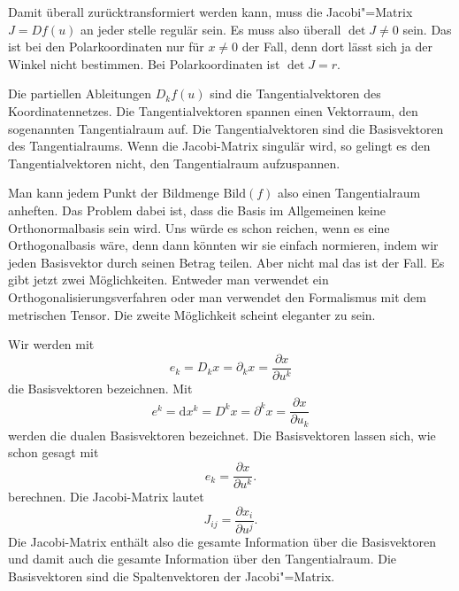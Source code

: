 \documentclass[a4paper,10pt,fleqn,twocolumn,twoside]{article}
\begin{document}
Damit überall zurücktransformiert werden kann, muss die
Jacobi"=Matrix \(J=Df(u)\) an jeder stelle regulär sein. Es muss also
überall \(\det J\neq 0\) sein. Das ist bei den Polarkoordinaten nur
für \(x\neq 0\) der Fall, denn dort lässt sich ja der Winkel nicht
bestimmen. Bei Polarkoordinaten ist \(\det J=r\).

Die partiellen Ableitungen \(D_k f(u)\) sind die Tangentialvektoren
des Koordinatennetzes. Die Tangentialvektoren spannen einen
Vektorraum, den sogenannten Tangentialraum auf. Die
Tangentialvektoren sind die Basisvektoren des Tangentialraums.
Wenn die Jacobi-Matrix singulär wird, so gelingt es den
Tangentialvektoren nicht, den Tangentialraum aufzuspannen.

Man kann jedem Punkt der Bildmenge \(\mathrm{Bild}(f)\) also einen
Tangentialraum anheften. Das Problem dabei ist, dass die Basis im
Allgemeinen keine Orthonormalbasis sein wird. Uns würde es schon
reichen, wenn es eine Orthogonalbasis wäre, denn dann könnten wir sie
einfach normieren, indem wir jeden Basisvektor durch seinen Betrag
teilen. Aber nicht mal das ist der Fall. Es gibt jetzt zwei
Möglichkeiten. Entweder man verwendet ein Orthogonalisierungsverfahren
oder man verwendet den Formalismus mit dem metrischen Tensor.
Die zweite Möglichkeit scheint eleganter zu sein.

Wir werden mit
\[e_k = D_kx = \partial_kx = \frac{\partial x}{\partial u^k}\]
die Basisvektoren bezeichnen. Mit
\[e^k = \mathrm dx^k = D^kx = \partial^kx = \frac{\partial x}{\partial u_k}\]
werden die dualen Basisvektoren bezeichnet. Die Basisvektoren lassen sich, wie schon gesagt mit
\[e_k = \frac{\partial x}{\partial u^k}.\]
berechnen. Die Jacobi-Matrix lautet
\[J_{ij} = \frac{\partial x_i}{\partial u^j}.\]
Die Jacobi-Matrix enthält also die gesamte Information über die
Basisvektoren und damit auch die gesamte Information über den
Tangentialraum. Die Basisvektoren sind die Spaltenvektoren der
Jacobi"=Matrix.
\end{document}
